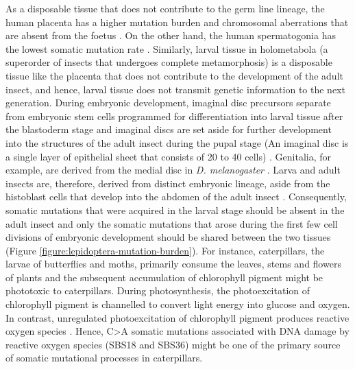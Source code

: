 As a disposable tissue that does not contribute to the germ line lineage, the human placenta has a higher mutation burden and chromosomal aberrations that are absent from the foetus \cite{Coorens2021-ct}. On the other hand, the human spermatogonia has the lowest somatic mutation rate \cite{Rahbari2016-ot}. Similarly, larval tissue in holometabola (a superorder of insects that undergoes complete metamorphosis) is a disposable tissue like the placenta that does not contribute to the development of the adult insect, and hence, larval tissue does not transmit genetic information to the next generation. During embryonic development, imaginal disc precursors separate from embryonic stem cells programmed for differentiation into larval tissue after the blastoderm stage and imaginal discs are set aside for further development into the structures of the adult insect during the pupal stage (An imaginal disc is a single layer of epithelial sheet that consists of 20 to 40 cells) \cite{Wieschaus1976}. Genitalia, for example, are derived from the medial disc in \textit{D. melanogaster} \cite{Bate1993}. Larva and adult insects are, therefore, derived from distinct embryonic lineage, aside from the histoblast cells that develop into the abdomen of the adult insect \cite{Bate1993}. Consequently, somatic mutations that were acquired in the larval stage should be absent in the adult insect and only the somatic mutations that arose during the first few cell divisions of embryonic development should be shared between the two tissues (Figure \ref{figure:lepidoptera-mutation-burden}). For instance, caterpillars, the larvae of butterflies and moths, primarily consume the leaves, stems and flowers of plants and the subsequent accumulation of chlorophyll pigment might be phototoxic to caterpillars. During photosynthesis, the photoexcitation of chlorophyll pigment is channelled to convert light energy into glucose and oxygen. In contrast, unregulated photoexcitation of chlorophyll pigment produces reactive oxygen species \cite{Foyer2018-in}. Hence, C>A somatic mutations associated with DNA damage by reactive oxygen species (SBS18 and SBS36) might be one of the primary source of somatic mutational processes in caterpillars. 

